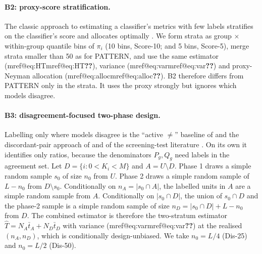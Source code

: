 \documentclass[pdflatex,sn-mathphys-num,iicol]{sn-jnl}
\makeatletter
\theoremstyle{thmstyleone}
\theoremstyle{thmstyletwo}
\theoremstyle{thmstylethree}
\newcommand{\Mref}[1]{\ifcsname mref@#1\endcsname\csname mref@#1\endcsname\else\textbf{??}\fi}
\makeatother
\begin{document}
\paragraph{B2: proxy-score stratification.} The classic approach to estimating a classifier's metrics with few labels stratifies on the classifier's score and allocates optimally \citep{bennett2010online,kumar2018classifier}. We form strata as group $\times$ within-group quantile bins of $\pi_i$ (10 bins, Score-10; and 5 bins, Score-5), merge strata smaller than 50 as for PATTERN, and use the same estimator (\Mref{eq:HT}), variance (\Mref{eq:var}) and proxy-Neyman allocation (\Mref{eq:alloc}). B2 therefore differs from PATTERN only in the strata. It uses the proxy strongly but ignores which models disagree.

\paragraph{B3: disagreement-focused two-phase design.} Labelling only where models disagree is the ``active $\neq$'' baseline of \citet{sawade2012active} and the discordant-pair approach of \citet{musgrove2023discordant} and of the screening-test literature \citep{pepe2001comparing}. On its own it identifies only ratios, because the denominators $P_g,Q_g$ need labels in the agreement set. Let $D=\{i:0<K_i<M\}$ and $A=U\setminus D$. Phase 1 draws a simple random sample $s_0$ of size $n_0$ from $U$. Phase 2 draws a simple random sample of $L-n_0$ from $D\setminus s_0$. Conditionally on $n_A=|s_0\cap A|$, the labelled units in $A$ are a simple random sample from $A$. Conditionally on $|s_0\cap D|$, the union of $s_0\cap D$ and the phase-2 sample is a simple random sample of size $n_D=|s_0\cap D|+L-n_0$ from $D$. The combined estimator is therefore the two-stratum estimator $\hat T=N_A\bar t_A+N_D\bar t_D$ with variance (\Mref{eq:var}) at the realised $(n_A,n_D)$, which is conditionally design-unbiased. We take $n_0=L/4$ (Dis-25) and $n_0=L/2$ (Dis-50).
\end{document}
